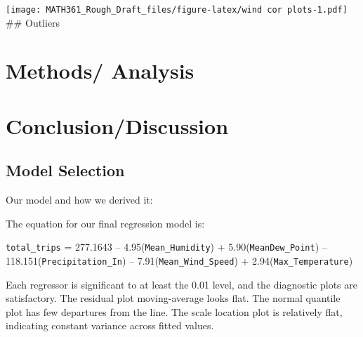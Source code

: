 \documentclass[
]{article}
\begin{document}
\texttt{[image: MATH361\_Rough\_Draft\_files/figure-latex/wind cor plots-1.pdf]}
\#\# Outliers

\section{Methods/ Analysis}\label{methods-analysis}

\section{Conclusion/Discussion}\label{conclusiondiscussion}

\subsection{Model Selection}\label{model-selection}

Our model and how we derived it:

The equation for our final regression model is:

\texttt{total\_trips} = 277.1643 -- 4.95(\texttt{Mean\_Humidity}) +
5.90(\texttt{MeanDew\_Point}) -- 118.151(\texttt{Precipitation\_In}) --
7.91(\texttt{Mean\_Wind\_Speed}) + 2.94(\texttt{Max\_Temperature})

Each regressor is significant to at least the 0.01 level, and the
diagnostic plots are satisfactory. The residual plot moving-average
looks flat. The normal quantile plot has few departures from the line.
The scale location plot is relatively flat, indicating constant variance
across fitted values.
\end{document}
